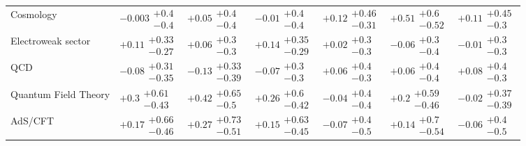 \begin{table}[H]
\begin{tabular}{lllllll}
Cosmology                                 &        $-0.003\substack{+0.4 \\ -0.4}$ &         $+0.05\substack{+0.4 \\ -0.4}$ &         $-0.01\substack{+0.4 \\ -0.4}$ &       $+0.12\substack{+0.46 \\ -0.31}$ &        $+0.51\substack{+0.6 \\ -0.52}$ &        $+0.11\substack{+0.45 \\ -0.3}$ \\
Electroweak sector                        &       $+0.11\substack{+0.33 \\ -0.27}$ &         $+0.06\substack{+0.3 \\ -0.3}$ &       $+0.14\substack{+0.35 \\ -0.29}$ &         $+0.02\substack{+0.3 \\ -0.3}$ &         $-0.06\substack{+0.3 \\ -0.4}$ &         $-0.01\substack{+0.3 \\ -0.3}$ \\
QCD                                       &       $-0.08\substack{+0.31 \\ -0.35}$ &       $-0.13\substack{+0.33 \\ -0.39}$ &         $-0.07\substack{+0.3 \\ -0.3}$ &         $+0.06\substack{+0.4 \\ -0.3}$ &         $+0.06\substack{+0.4 \\ -0.4}$ &         $+0.08\substack{+0.4 \\ -0.3}$ \\
Quantum Field Theory                      &        $+0.3\substack{+0.61 \\ -0.43}$ &        $+0.42\substack{+0.65 \\ -0.5}$ &        $+0.26\substack{+0.6 \\ -0.42}$ &         $-0.04\substack{+0.4 \\ -0.4}$ &        $+0.2\substack{+0.59 \\ -0.46}$ &       $-0.02\substack{+0.37 \\ -0.39}$ \\
AdS/CFT                                   &       $+0.17\substack{+0.66 \\ -0.46}$ &       $+0.27\substack{+0.73 \\ -0.51}$ &       $+0.15\substack{+0.63 \\ -0.45}$ &         $-0.07\substack{+0.4 \\ -0.5}$ &        $+0.14\substack{+0.7 \\ -0.54}$ &         $-0.06\substack{+0.4 \\ -0.5}$ \\
\bottomrule
\end{tabular}\normalsize\renewcommand{\arraystretch}{1}
\end{table}
